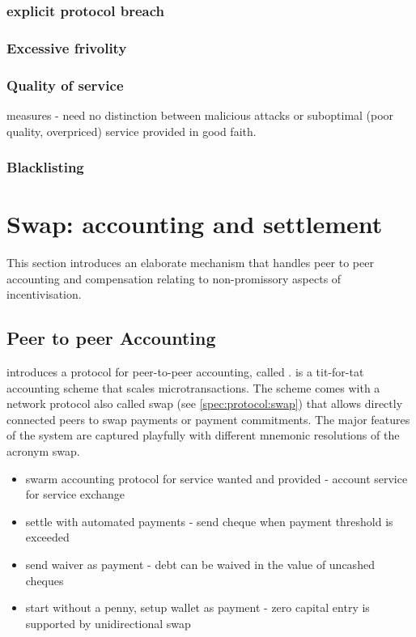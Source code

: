 \subsubsection{explicit protocol breach}

\subsubsection{Excessive frivolity}

\subsubsection{Quality of service}

measures - need no distinction between malicious attacks or suboptimal (poor quality, overpriced) service provided in good faith.

\subsubsection{Blacklisting}

\section{Swap: accounting and settlement}\label{sec:accounting-and-settlement}

This section introduces an elaborate mechanism that handles peer to peer accounting and compensation relating to non-promissory aspects of incentivisation. 


\subsection{Peer to peer Accounting}\label{sec:accounting}


\cite{ethersphere2016sw3} introduces a protocol for peer-to-peer accounting, called .  is a tit-for-tat accounting scheme that scales microtransactions. The scheme comes with a network protocol also called swap (see \ref{spec:protocol:swap}) that allows directly connected peers to swap payments or payment commitments. The major features of the system are captured playfully with different mnemonic resolutions of the acronym swap.

\begin{itemize}
    \item swarm accounting protocol for service wanted and provided - account service for service exchange
    \item settle with automated payments - send cheque when payment threshold is exceeded
    \item send waiver as payment - debt can be waived in the value of uncashed cheques 
    \item start without a penny, setup wallet as payment - zero capital entry is supported by unidirectional swap
\end{itemize}

